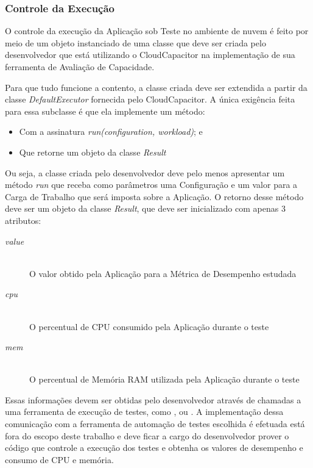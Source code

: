\subsubsection{Controle da Execução}
\label{subsubsec:funcionamento_executor}
O controle da execução da Aplicação sob Teste no ambiente de nuvem é feito por 
meio de um objeto instanciado de uma classe que deve ser criada pelo
desenvolvedor que está utilizando o CloudCapacitor na implementação de sua 
ferramenta de Avaliação de Capacidade.

Para que tudo funcione a contento, a classe criada deve ser extendida a partir
da classe \emph{DefaultExecutor} fornecida pelo CloudCapacitor. A única 
exigência feita para essa subclasse é que ela implemente um método:

\begin{itemize}
  \item Com a assinatura \emph{run(configuration, workload)}; e
  \item Que retorne um objeto da classe \emph{Result}
\end{itemize}

Ou seja, a classe criada pelo desenvolvedor deve pelo menos apresentar um método
\emph{run} que receba como parâmetros uma Configuração e um valor para a Carga 
de Trabalho que será imposta sobre a Aplicação. O retorno desse método deve ser
um objeto da classe \emph{Result}, que deve ser inicializado com apenas 3 atributos:

\begin{description}
  \item[\emph{value}] \hfill \\
    O valor obtido pela Aplicação para a Métrica de Desempenho estudada
  \item[\emph{cpu}] \hfill \\
    O percentual de CPU consumido pela Aplicação durante o teste
  \item[\emph{mem}] \hfill \\
    O percentual de Memória RAM utilizada pela Aplicação durante o teste
\end{description}

Essas informações devem ser obtidas pelo desenvolvedor através de chamadas a
uma ferramenta de execução de testes, como \cite{cunha2012ambiente}, 
\cite{jayasinghe2012} ou \cite{silva2013cloudbench}. A implementação dessa 
comunicação com a ferramenta de automação de testes escolhida é efetuada está 
fora do escopo deste trabalho e deve ficar a cargo do desenvolvedor prover o 
código que controle a execução dos testes e obtenha os valores de desempenho
e consumo de CPU e memória.

